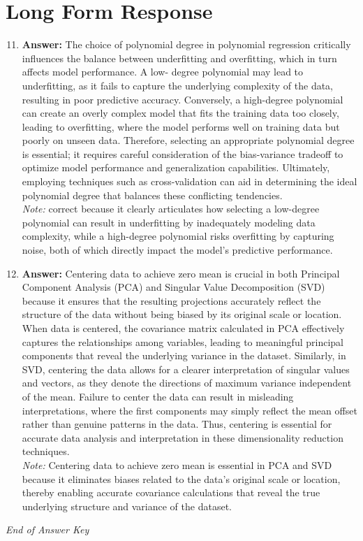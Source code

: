 \documentclass[12pt]{article}
\begin{document}
\section*{Long Form Response}
\begin{enumerate}[label=\arabic*.]
\setcounter{enumi}{10}
\item \textbf{Answer:} The choice of polynomial degree in polynomial regression critically influences the balance between underfitting and overfitting, which in turn affects model performance. A low- degree polynomial may lead to underfitting, as it fails to capture the underlying complexity of the data, resulting in poor predictive accuracy. Conversely, a high-degree polynomial can create an overly complex model that fits the training data too closely, leading to overfitting, where the model performs well on training data but poorly on unseen data. Therefore, selecting an appropriate polynomial degree is essential; it requires careful consideration of the bias-variance tradeoff to optimize model performance and generalization capabilities. Ultimately, employing techniques such as cross-validation can aid in determining the ideal polynomial degree that balances these conflicting tendencies.
\\ \textit{Note:} correct because it clearly articulates how selecting a low-degree polynomial can result in underfitting by inadequately modeling data complexity, while a high-degree polynomial risks overfitting by capturing noise, both of which directly impact the model's predictive performance.
\item \textbf{Answer:} Centering data to achieve zero mean is crucial in both Principal Component Analysis (PCA) and Singular Value Decomposition (SVD) because it ensures that the resulting projections accurately reflect the structure of the data without being biased by its original scale or location. When data is centered, the covariance matrix calculated in PCA effectively captures the relationships among variables, leading to meaningful principal components that reveal the underlying variance in the dataset. Similarly, in SVD, centering the data allows for a clearer interpretation of singular values and vectors, as they denote the directions of maximum variance independent of the mean. Failure to center the data can result in misleading interpretations, where the first components may simply reflect the mean offset rather than genuine patterns in the data. Thus, centering is essential for accurate data analysis and interpretation in these dimensionality reduction techniques.
\\ \textit{Note:} Centering data to achieve zero mean is essential in PCA and SVD because it eliminates biases related to the data's original scale or location, thereby enabling accurate covariance calculations that reveal the true underlying structure and variance of the dataset.
\end{enumerate}

\vfill
\noindent\textit{End of Answer Key}
\end{document}
